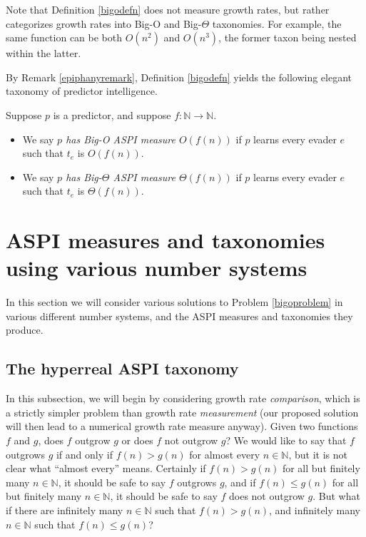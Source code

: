 \documentclass[twoside,11pt]{article}
\begin{document}
Note that Definition \ref{bigodefn} does not measure growth rates, but rather
categorizes growth rates into Big-O and Big-$\Theta$ taxonomies.
For example, the same function can be
both $O(n^2)$ and $O(n^3)$, the former taxon being nested within the latter.

By Remark \ref{epiphanyremark}, Definition \ref{bigodefn} yields the following elegant
taxonomy of predictor intelligence.

\begin{definition}
\label{bigointelligencedefn}
    Suppose $p$ is a predictor, and suppose $f:\mathbb N\to\mathbb N$.
    \begin{itemize}
        \item
        We say \emph{$p$ has Big-O ASPI measure $O(f(n))$} if
        $p$ learns every evader $e$ such that $t_e$ is $O(f(n))$.
        \item
        We say \emph{$p$ has Big-$\Theta$ ASPI measure $\Theta(f(n))$} if
        $p$ learns every evader $e$ such that $t_e$ is $\Theta(f(n))$.
    \end{itemize}
\end{definition}

\section{ASPI measures and taxonomies using various number systems}
\label{exoticsection}

In this section we will consider various solutions to
Problem \ref{bigoproblem} in various different number systems,
and the ASPI measures and taxonomies they produce.

\subsection{The hyperreal ASPI taxonomy}
\label{hyperrealsubsection}

In this subsection, we will begin by considering growth rate \emph{comparison}, which is
a strictly simpler problem than growth rate \emph{measurement} (our proposed solution will
then lead to a numerical growth rate measure anyway). Given two functions $f$
and $g$, does $f$ outgrow $g$ or does $f$ not outgrow $g$? We would like to say that
$f$ outgrows $g$ if and only if $f(n)>g(n)$ for almost every $n\in\mathbb N$, but it is
not clear what ``almost every'' means. Certainly if $f(n)>g(n)$ for all but finitely many
$n\in\mathbb N$, it should be safe to say $f$ outgrows $g$, and if $f(n)\leq g(n)$ for
all but finitely many $n\in\mathbb N$, it should be safe to say $f$ does not outgrow
$g$. But what if there are infinitely many $n\in\mathbb N$ such that $f(n)>g(n)$, and
infinitely many $n\in\mathbb N$ such that $f(n)\leq g(n)$?
\end{document}
